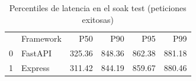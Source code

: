 \begin{table}
\caption{Percentiles de latencia en el soak test (peticiones exitosas)}
\label{tab:soak_percentiles}
\begin{tabular}{llrrrr}
 & Framework & P50 & P90 & P95 & P99 \\
0 & FastAPI & 325.36 & 848.36 & 862.38 & 881.18 \\
1 & Express & 311.42 & 844.19 & 859.67 & 880.46 \\
\end{tabular}
\end{table}
